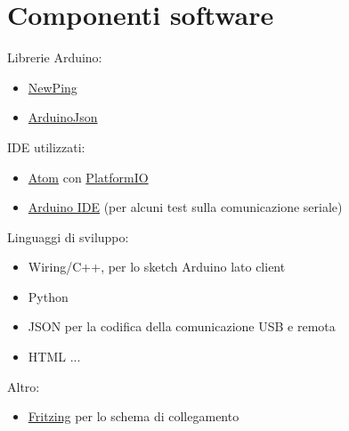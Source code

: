 \section{Componenti software}
Librerie Arduino:
\begin{itemize}
	\item \href{http://playground.arduino.cc/Code/NewPing}{NewPing}
	\item \href{https://github.com/bblanchon/ArduinoJson}{ArduinoJson} 
\end{itemize}
IDE utilizzati: 
\begin{itemize}
	\item \href{https://atom.io/}{Atom} con \href{ http://platformio.org/}{PlatformIO} 
	\item \href{https://www.arduino.cc/en/Main/Software}{Arduino IDE} (per alcuni test sulla comunicazione seriale) 
\end{itemize}
Linguaggi di sviluppo:
\begin{itemize}
	\item Wiring/C++, per lo sketch Arduino lato client 
	\item Python
	\item JSON per la codifica della comunicazione USB e remota
	\item HTML ...
\end{itemize}
Altro:
\begin{itemize}
	\item \href{http://fritzing.org}{Fritzing} per lo schema di collegamento
\end{itemize}